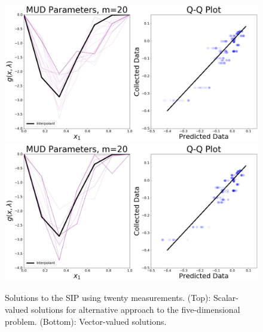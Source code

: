 \begin{figure}[htbp]
\centering
  \includegraphics[width=0.95\linewidth]{figures/pde-highd/pde-highd_pair_D-alt-5-1_m20.png}
  \includegraphics[width=0.95\linewidth]{figures/pde-highd/pde-highd_pair_D-alt-5-5_m20.png}
\caption{Solutions to the SIP using twenty measurements.
(Top): Scalar-valued solutions for alternative approach to the five-dimensional problem.
(Bottom): Vector-valued solutions.
}
\label{fig:pde-highd-5d-alt-mud-20}
\end{figure}

